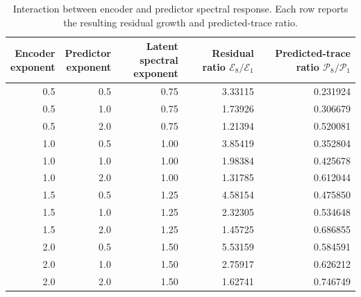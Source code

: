 \documentclass{article}
\begin{document}
\begin{table}[H]
\centering
\caption{Interaction between encoder and predictor spectral response. Each row reports the resulting residual growth and predicted-trace ratio.}
\label{tab:supp-interaction}
\setlength{\tabcolsep}{3pt}
\begin{tabular*}{\linewidth}{@{\extracolsep{\fill}}rrrrr@{}}
\toprule
\shortstack{Encoder\\exponent} & \shortstack{Predictor\\exponent} & \shortstack{Latent spectral\\exponent} & \shortstack{Residual ratio\\$\mathcal E_8/\mathcal E_1$} & \shortstack{Predicted-trace ratio\\$\mathcal P_8/\mathcal P_1$} \\
\midrule
0.5 & 0.5 & 0.75 & 3.33115 & 0.231924 \\
0.5 & 1.0 & 0.75 & 1.73926 & 0.306679 \\
0.5 & 2.0 & 0.75 & 1.21394 & 0.520081 \\
1.0 & 0.5 & 1.00 & 3.85419 & 0.352804 \\
1.0 & 1.0 & 1.00 & 1.98384 & 0.425678 \\
1.0 & 2.0 & 1.00 & 1.31785 & 0.612044 \\
1.5 & 0.5 & 1.25 & 4.58154 & 0.475850 \\
1.5 & 1.0 & 1.25 & 2.32305 & 0.534648 \\
1.5 & 2.0 & 1.25 & 1.45725 & 0.686855 \\
2.0 & 0.5 & 1.50 & 5.53159 & 0.584591 \\
2.0 & 1.0 & 1.50 & 2.75917 & 0.626212 \\
2.0 & 2.0 & 1.50 & 1.62741 & 0.746749 \\
\bottomrule
\end{tabular*}
\end{table}
\end{document}
